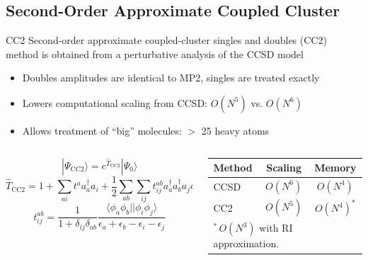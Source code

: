 \documentclass[9pt,t,xcolor=table]{beamer}
\begin{document}
\subsection{Second-Order Approximate Coupled Cluster}
\begin{frame}{\huge CC2}\large
	Second-order approximate coupled-cluster singles and doubles (CC2) method is obtained from a perturbative analysis of the CCSD model
	\vspace{4pt}
	\begin{itemize}
		\item Doubles amplitudes are identical to MP2, singles are treated exactly
		\item Lowers computational scaling from CCSD: $O(N^5)$ vs. $O(N^6)$
		\item Allows treatment of “big” molecules: $>$ 25 heavy atoms
	\end{itemize}
	\vspace{5pt}
	\begin{columns}[c]
		\begin{column}{0.55\textwidth}
			\centering
			\[ |\Psi_{\mathrm{CC2}} \rangle = e^{\hat{T}_{\mathrm{CC2}}} | \Psi_0 \rangle \]
			\vspace{5pt}
			\[
			\hat{T}_{\mathrm{CC2}} = 1 + \sum_{ai} t^a a_a^\dagger a_i + \frac{1}{2} \sum_{ab} \sum_{ij} t_{ij}^{ab} a_a^\dagger a_b^\dagger a_j a_i  \] 
			\vspace{5pt}
			\[ t^{ab}_{ij} = \frac{1}{1+\delta_{ij}\delta_{ab}}\frac{\langle \phi_a \phi_b || \phi_i \phi_j \rangle}{\epsilon_a + \epsilon_b - \epsilon_i - \epsilon_j}
			\]
		\end{column}
		\begin{column}{0.45\textwidth}
			\begin{table}
				\centering
				\begin{tabular}{lcc}\toprule
				\textbf{Method} & \textbf{Scaling} & \textbf{Memory}\\\midrule
				CCSD & $O(N^6)$ & $O(N^{4})$\\
				CC2 & $O(N^5)$ & $O(N^{4})^*$\\\bottomrule
				\multicolumn{3}{l}{\small $^*\,O(N^3)$ with RI approximation.}
				\end{tabular}
			\end{table}
		\end{column}
	\end{columns}
	\vfill
\end{frame}
\end{document}
